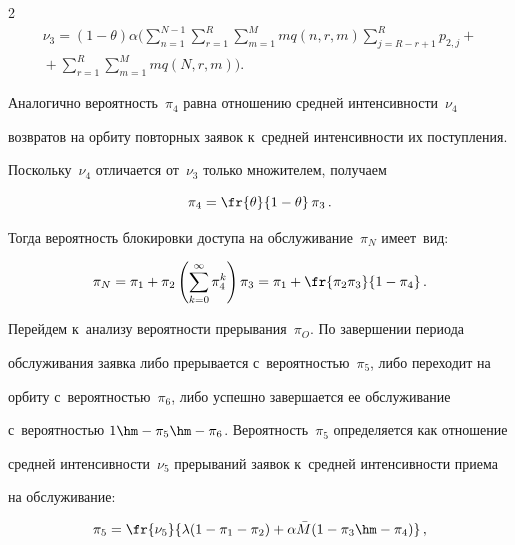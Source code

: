\begin{multicols}{2}
\begin{multline*}
   \nu_3=(1-\theta) \alpha  \Bigg(  \sum\limits_{n=1}^{N-1}\sum\limits_{r=1}^R \sum\limits_{m=1}^M m q(n,r,m) \!\!\!\!\sum\limits_{j=R-r+1}^R 

\!\!\! \!p_{2,j} +{}\\

   {}+\!\! \sum\limits_{r=1}^R \sum\limits_{m=1}^M\! mq(N,r,m)  \Bigg).

\end{multline*}



Аналогично вероятность~$\pi_4$ рав\-на отношению сред\-ней ин\-тен\-сив\-ности~$\nu_4$ 

возвратов на орбиту по\-втор\-ных заявок к~средней ин\-тен\-сив\-ности их по\-ступ\-ле\-ния. 

Поскольку~$\nu_4$ отличается от~$\nu_3$ только множителем, получаем 

$$

\pi_4=\fr{\theta}{1-\theta}\, \pi_3\,.

$$

Тогда ве\-ро\-ят\-ность блокировки до\-сту\-па на обслуживание~$\pi_N$ име\-ет~вид:

\begin{equation*} 


    \pi_N=\pi_1 + \pi_2 \left( \sum\limits_{k=0}^{\infty} \pi_4^k \right) 

\pi_3=\pi_1+\fr{\pi_2 \pi_3}{1-\pi_4}\,.

\end{equation*}



Перейдем к~анализу ве\-ро\-ят\-ности прерывания~$\pi_O$. По завершении периода 

обслуживания заявка либо прерывается с~ве\-ро\-ят\-ностью~$\pi_5$, либо переходит на 

орбиту с~ве\-ро\-ят\-ностью~$\pi_6$, либо успешно завершается ее обслуживание 

с~ве\-ро\-ят\-ностью $1\hm-\pi_5\hm- \pi_6$.  Ве\-ро\-ят\-ность~$\pi_{5}$ определяется как отношение 

средней ин\-тен\-сив\-ности~$\nu_5$ прерываний заявок к~сред\-ней ин\-тен\-сив\-ности приема 

на обслуживание:

$$

\pi_5=\fr{\nu_5}{\lambda(1-\pi_1-\pi_2)+ \alpha \bar{M} (1- \pi_3\hm-\pi_4)}\,,

$$


\end{multicols}
